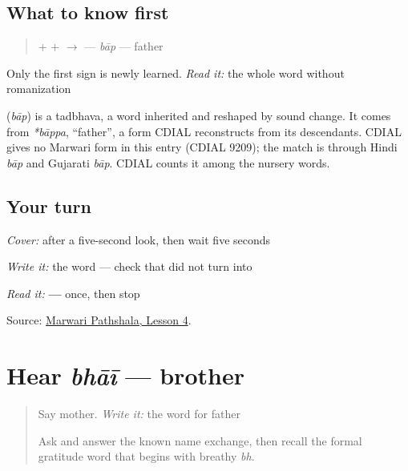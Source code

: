 \subsection*{What to know first}
\begin{quote}
\textbf{} + \textbf{} + \textbf{} $\to$ \textbf{} — \emph{bāp} — father
\end{quote}

Only the first sign is newly learned. \emph{Read it:} the whole word without romanization

\begin{cousinweb}
\textbf{} (\emph{bāp}) is a tadbhava, a word inherited and reshaped by sound change. It comes from \emph{*bāppa}, \textquotedblleft{}father\textquotedblright{}, a form CDIAL reconstructs from its descendants. CDIAL gives no Marwari form in this entry (CDIAL 9209); the match is through Hindi \emph{bāp} and Gujarati \emph{bāp}. CDIAL counts it among the nursery words.
\end{cousinweb}

\subsection*{Your turn}
\emph{Cover:} \textbf{} after a five-second look, then wait five seconds

\emph{Write it:} the word — check that \textbf{} did not turn into \textbf{}

\begin{tcolorbox}[breakable,colback=teal!4,colframe=teal!35!black,title={Before you move on}]
\emph{Read it:} \textbf{ — } once, then stop

Source: \href{https://www.marwaripathshala.com/marwari-lesson-4-english}{Marwari Pathshala, Lesson 4}.
\end{tcolorbox}
\section[bhāī]{Hear \emph{bhāī} — brother}

\label{lesson:MW-C08-hear-bhai}



\begin{quote}
Say mother. \emph{Write it:} the word for father

Ask and answer the known name exchange, then recall the formal gratitude word that begins with breathy \emph{bh}.
\end{quote}

